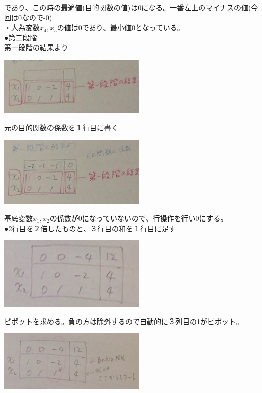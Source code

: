 \documentclass{jsarticle}
\begin{document}
{{{\begin{center}
	\end{center}
	であり、この時の最適値(目的関数の値)は0になる。一番左上のマイナスの値(今回は0なので-0)\\
	・人為変数$x_4,x_5$の値は0であり、最小値0となっている。\\
	{\Large{●第二段階}}\\
	第一段階の結果より
	\begin{center}
		\includegraphics[width=7cm]{1_7_12.JPG}
	\end{center}
	元の目的関数の係数を１行目に書く
	\begin{center}
		\includegraphics[width=7cm]{1_7_13.JPG}
	\end{center}
	基底変数$x_1,x_2$の係数が0になっていないので、行操作を行い0にする。\\
	●2行目を２倍したものと、３行目の和を１行目に足す\\
	\begin{center}
		\includegraphics[width=7cm]{1_7_14.JPG}
	\end{center}
	ビボットを求める。負の方は除外するので自動的に３列目の1がピボット。
	\begin{center}
		\includegraphics[width=7cm]{1_7_15.JPG}

\end{center}}}}
\end{document}
